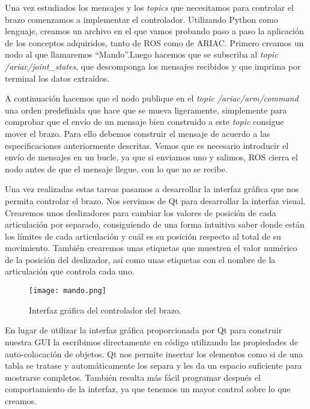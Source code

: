 Una vez estudiados los mensajes y los \textit{topics} que necesitamos para controlar el brazo comenzamos a implementar el controlador. Utilizando Python como lenguaje, creamos un archivo en el que vamos probando paso a paso la aplicación de los conceptos adquiridos, tanto de ROS como de ARIAC. 
Primero creamos un nodo al que llamaremos \textquotedblleft Mando\textquotedblright .Luego hacemos que se subscriba al \textit{topic} \textit{/ariac/joint\_states}, que descomponga los mensajes recibidos y que imprima por terminal los datos extraídos. 

A continuación hacemos que el nodo publique en el \textit{topic /ariac/arm/command} una orden predefinida que hace que se mueva ligeramente, simplemente para comprobar que el envío de un mensaje bien construido a este \textit{topic} consigue mover el brazo. Para ello debemos construir el mensaje de acuerdo a las especificaciones anteriormente descritas. Vemos que es necesario introducir el envío de mensajes en un bucle, ya que si enviamos uno y salimos, ROS cierra el nodo antes de que el mensaje llegue, con lo que no se recibe.

Una vez realizadas estas tareas pasamos a desarrollar la interfaz gráfica que nos permita controlar el brazo. Nos servimos de Qt para desarrollar la interfaz visual. Crearemos unos deslizadores para cambiar los valores de posición de cada articulación por separado, consiguiendo de una forma intuitiva saber donde están los límites de cada articulación y cuál es su posición respecto al total de su movimiento. También crearemos unas etiquetas que muestren el valor numérico de la posición del deslizador, así como unas etiquetas con el nombre de la articulación que controla cada uno. 

\begin{figure}[]
	\centering\texttt{[image: mando.png]}
	\caption{Interfaz gráfica del controlador del brazo.}
	\label{fig:mando}
\end{figure}

En lugar de utilizar la interfaz gráfica proporcionada por Qt para construir nuestra GUI la escribimos directamente en código utilizando las propiedades de auto-colocación de objetos. Qt nos permite insertar los elementos como si de una tabla se tratase y automáticamente los separa y les da un espacio suficiente para mostrarse completos. También resulta más fácil programar después el comportamiento de la interfaz, ya que tenemos un mayor control sobre lo que creamos. 

